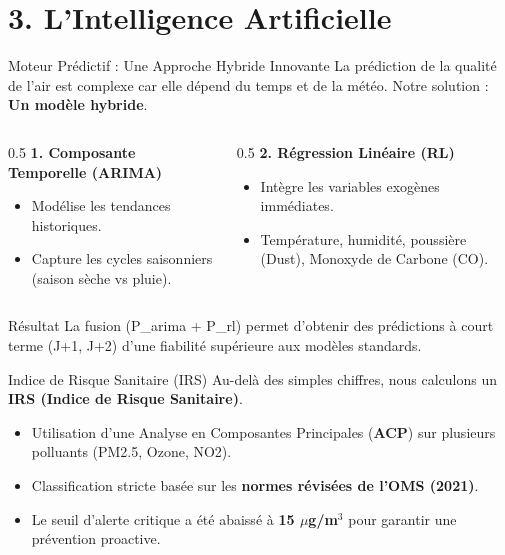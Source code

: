 \documentclass[10pt, aspectratio=169]{beamer}
\begin{document}
\section{3. L'Intelligence Artificielle}
\begin{frame}{Moteur Prédictif : Une Approche Hybride Innovante}
  La prédiction de la qualité de l'air est complexe car elle dépend du temps et de la météo. Notre solution : \textbf{Un modèle hybride}.
  \vspace{0.3cm}
  \begin{columns}
    \begin{column}{0.5\textwidth}
      \textbf{1. Composante Temporelle (ARIMA)}
      \begin{itemize}
        \item Modélise les tendances historiques.
        \item Capture les cycles saisonniers (saison sèche vs pluie).
      \end{itemize}
    \end{column}
    \begin{column}{0.5\textwidth}
      \textbf{2. Régression Linéaire (RL)}
      \begin{itemize}
        \item Intègre les variables exogènes immédiates.
        \item Température, humidité, poussière (Dust), Monoxyde de Carbone (CO).
      \end{itemize}
    \end{column}
  \end{columns}
  \vspace{0.4cm}
  \begin{block}{Résultat}
    La fusion (P\_arima + P\_rl) permet d'obtenir des prédictions à court terme (J+1, J+2) d'une fiabilité supérieure aux modèles standards.
  \end{block}
\end{frame}

\begin{frame}{Indice de Risque Sanitaire (IRS)}
  Au-delà des simples chiffres, nous calculons un \textbf{IRS (Indice de Risque Sanitaire)}.
  \begin{itemize}
    \item Utilisation d'une Analyse en Composantes Principales (\textbf{ACP}) sur plusieurs polluants (PM2.5, Ozone, NO2).
    \item Classification stricte basée sur les \textbf{normes révisées de l'OMS (2021)}.
    \item Le seuil d'alerte critique a été abaissé à \textbf{15 $\mu$g/m$^3$} pour garantir une prévention proactive.
  \end{itemize}
\end{frame}
\end{document}
